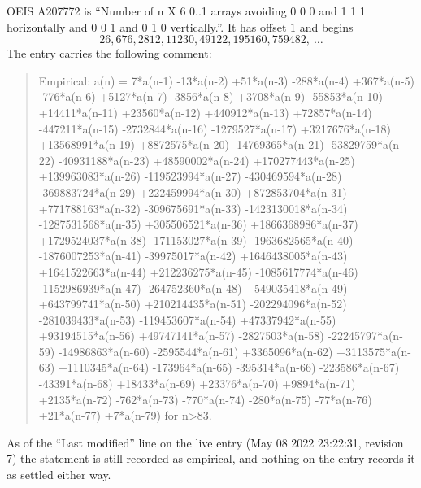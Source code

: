 \documentclass[11pt,a4paper]{article}
\theoremstyle{plain}
\theoremstyle{definition}
\begin{document}
OEIS A207772 is ``Number of n X 6 0..1 arrays avoiding 0 0 0 and 1 1 1 horizontally and 0 0 1 and 0 1 0 vertically.''. It has offset
$1$ and begins
\[
26, 676, 2812, 11230, 49122, 195160, 759482,\ \dots
\]
The entry carries the following comment:
\begin{quote}\small
Empirical: a(n) = 7*a(n-1) -13*a(n-2) +51*a(n-3) -288*a(n-4) +367*a(n-5) -776*a(n-6) +5127*a(n-7) -3856*a(n-8) +3708*a(n-9) -55853*a(n-10) +14411*a(n-11) +23560*a(n-12) +440912*a(n-13) +72857*a(n-14) -447211*a(n-15) -2732844*a(n-16) -1279527*a(n-17) +3217676*a(n-18) +13568991*a(n-19) +8872575*a(n-20) -14769365*a(n-21) -53829759*a(n-22) -40931188*a(n-23) +48590002*a(n-24) +170277443*a(n-25) +139963083*a(n-26) -119523994*a(n-27) -430469594*a(n-28) -369883724*a(n-29) +222459994*a(n-30) +872853704*a(n-31) +771788163*a(n-32) -309675691*a(n-33) -1423130018*a(n-34) -1287531568*a(n-35) +305506521*a(n-36) +1866368986*a(n-37) +1729524037*a(n-38) -171153027*a(n-39) -1963682565*a(n-40) -1876007253*a(n-41) -39975017*a(n-42) +1646438005*a(n-43) +1641522663*a(n-44) +212236275*a(n-45) -1085617774*a(n-46) -1152986939*a(n-47) -264752360*a(n-48) +549035418*a(n-49) +643799741*a(n-50) +210214435*a(n-51) -202294096*a(n-52) -281039433*a(n-53) -119453607*a(n-54) +47337942*a(n-55) +93194515*a(n-56) +49747141*a(n-57) -2827503*a(n-58) -22245797*a(n-59) -14986863*a(n-60) -2595544*a(n-61) +3365096*a(n-62) +3113575*a(n-63) +1110345*a(n-64) -173964*a(n-65) -395314*a(n-66) -223586*a(n-67) -43391*a(n-68) +18433*a(n-69) +23376*a(n-70) +9894*a(n-71) +2135*a(n-72) -762*a(n-73) -770*a(n-74) -280*a(n-75) -77*a(n-76) +21*a(n-77) +7*a(n-79) for n>83.
\end{quote}
As of the ``Last modified'' line on the live entry (May 08 2022 23:22:31, revision
7) the statement is still recorded as empirical, and nothing on the entry
records it as settled either way.
\end{document}

